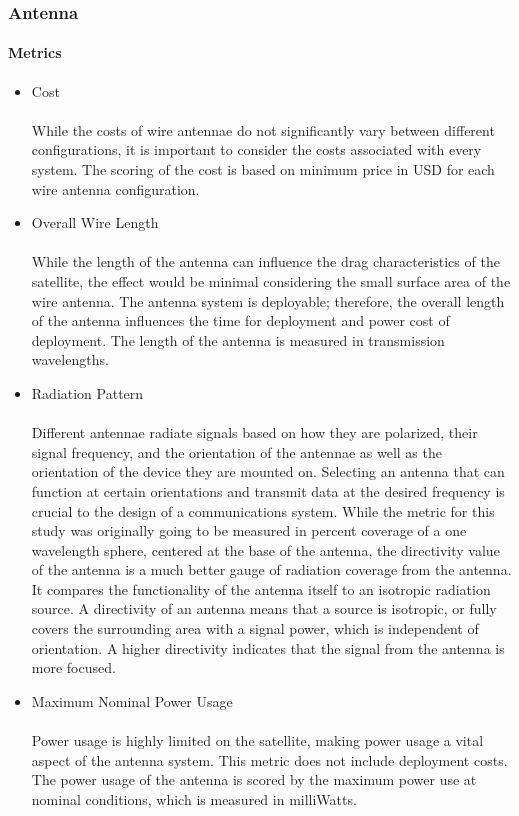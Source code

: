 \subsubsection{Antenna}


\paragraph{Metrics}
\begin{itemize}
    \item Cost\\
    \\
    While the costs of wire antennae do not significantly vary between different configurations, it is important to consider the costs associated with every system. The scoring of the cost is based on minimum price in USD for each wire antenna configuration.\\
    \item Overall Wire Length\\
    \\
    While the length of the antenna can influence the drag characteristics of the satellite, the effect would be minimal considering the small surface area of the wire antenna. The antenna system is deployable; therefore, the overall length of the antenna influences the time for deployment and power cost of deployment. The length of the antenna is measured in transmission wavelengths.\\
    \item Radiation Pattern \\
    \\
    Different antennae radiate signals based on how they are polarized, their signal frequency, and the orientation of the antennae as well as the orientation of the device they are mounted on. Selecting an antenna that can function at certain orientations and transmit data at the desired frequency is crucial to the design of a communications system. While the metric for this study was originally going to be measured in percent coverage of a one wavelength sphere, centered at the base of the antenna, the directivity value of the antenna is a much better gauge of radiation coverage from the antenna. It compares the functionality of the antenna itself to an isotropic radiation source. A directivity of an antenna means that a source is isotropic, or fully covers the surrounding area with a signal power, which is independent of orientation. A higher directivity indicates that the signal from the antenna is more focused.\\
    \item Maximum Nominal Power Usage \\
    \\
    Power usage is highly limited on the satellite, making power usage a vital aspect of the antenna system. This metric does not include deployment costs. The power usage of the antenna is scored by the maximum power use at nominal conditions, which is measured in milliWatts.
\end{itemize}




